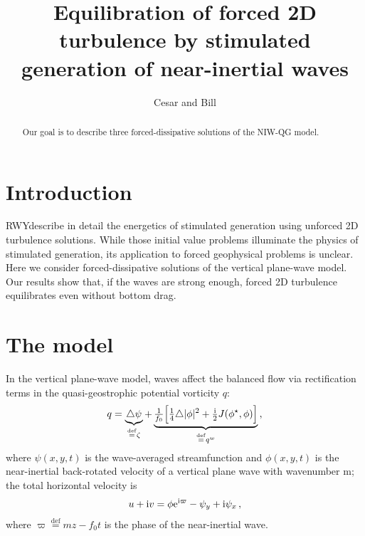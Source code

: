 \documentclass[12pt]{article}
\newcommand{\defn}{\ensuremath{\stackrel{\mathrm{def}}{=}}}
\newcommand{\com}{\, ,}
\def\beq{\begin{equation}}
\def\eeq{\end{equation}}
\newcommand{\lap}{\triangle}
\def\ii{{\rm i}}
\def\ee{{\rm e}}
\newcommand{\?}{\stackrel{?}{=}}
\newcommand{\RWY}{RWY}
\begin{document}
\title{Equilibration of forced 2D turbulence by stimulated generation of
        near-inertial waves}

\author{Cesar and Bill}


\maketitle

%
%

\begin{abstract}
Our goal is to describe three forced-dissipative solutions of the NIW-QG model.
\end{abstract}

%
%

\section{Introduction}

\RWY describe in detail the energetics of stimulated generation using unforced 2D
turbulence solutions.  While those initial value problems illuminate the physics of
stimulated generation, its application to forced geophysical problems
is unclear. Here we consider forced-dissipative solutions of the vertical plane-wave
model. Our results show that, if the waves are strong enough, forced 2D turbulence
equilibrates even without bottom drag.


\section{The model}
In the vertical plane-wave model, waves affect the balanced
flow via rectification terms in the quasi-geostrophic potential vorticity $q$:
\beq
\label{qgpv}
q = \underbrace{\lap \psi}_{\defn \zeta} +
                \underbrace{\tfrac{1}{f_0}\Big[ \tfrac{1}{4} \lap |\phi|^2 + \tfrac{\ii}{2}
                J(\phi^\star,\phi)\Big]}_{\defn q^w}\com
\eeq
where $\psi(x,y,t)$ is the wave-averaged streamfunction and $\phi(x,y,t)$ is the near-inertial
back-rotated velocity of a vertical plane wave with wavenumber m; the total
horizontal velocity is
\beq
\label{phi}
u + \ii v =  \phi \ee^{\ii\varpi}-\psi_y + \ii \psi_x\com
\eeq
where $\varpi \defn m z -f_0 t$ is the phase of the near-inertial wave.
\end{document}

